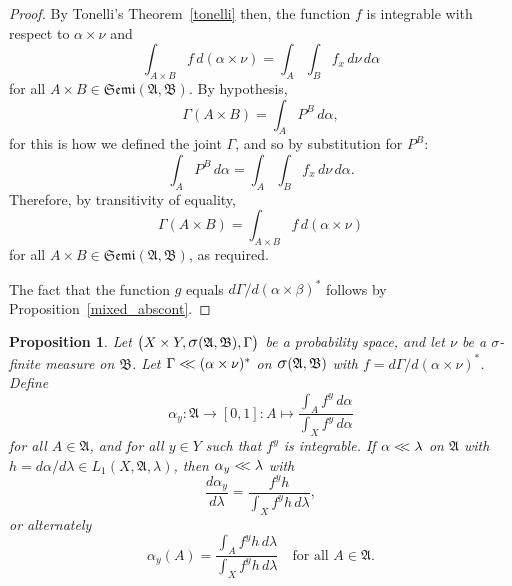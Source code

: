 \documentclass[
twoside=true,
paper=letter,
fontsize=9pt,
pagesize=auto,
leqno,
openany,
headsepline,
overfullrule,
]{scrbook}
\theoremstyle{plain}
\theoremstyle{plain}
\newtheorem{prop}[thm]{Proposition}
\theoremstyle{definition}
\theoremstyle{bfnoteitalic}
\theoremstyle{bfnoteroman}
\newcommand{\sigalg}[1]{\mathfrak{#1}}
\newcommand{\sagb}{\mathop{\hbox{\large{$\sigma$}}}\nolimits}
\newcommand{\textsigma}{\hbox{\large{$\sigma$}}\kern-1pt}
\newcommand{\sigmaalgebra}{\sigalg{A}}
\newcommand{\productsemiring}[2]{\mathfrak{Semi}(#1,#2)}
\newcommand{\productsig}[2]{\sagb(#1,#2)}
\newcommand{\funcf}{f}
\newcommand{\funcg}{g}
\newcommand{\funch}{h}
\newcommand{\function}{f}
\newcommand{\measurespace}{X}
\newcommand{\measurespaceii}{Y}
\newcommand{\abscont}{\mathrel{< \kern-3.5pt <}}
\newcommand{\measnu}{\nu}
\newcommand{\measlambda}{\lambda}
\newcommand{\seti}{A}
\newcommand{\pspace}{\measurespace}%
\newcommand{\sspace}{\measurespaceii}%
\newcommand{\pspaceset}{A}
\newcommand{\sspaceset}{B}
\newcommand{\pspaceelt}{x}
\newcommand{\sspaceelt}{y}
\newcommand{\sspacesig}{\sigalg{B}}
\newcommand{\pspacesig}{\sigalg{A}}
\newcommand{\measonprod}{\Gamma}%
\newcommand{\marginalone}{\alpha}%
\newcommand{\marginaltwo}{\beta}%
\newcommand{\prior}{\marginalone}
\newcommand{\predictive}{\marginaltwo}
\begin{document}
\begin{proof}
By Tonelli's Theorem~\ref{tonelli} then, the function
$\funcf$ is integrable with respect to
$\prior\times\measnu$ and
\[
\int_{\pspaceset\times\sspaceset}
\funcf \,d(\prior\times\measnu)
=
\int_\pspaceset\int_\sspaceset
\function_\pspaceelt\,
d\measnu\,d\prior
\]
for all $\pspaceset\times\sspaceset
\in\productsemiring{\pspacesig}{\sspacesig}.$
By hypothesis,
\[
\measonprod(\pspaceset\times\sspaceset)
=
\int_\pspaceset P^\sspaceset\, d\prior,
\]
for this is how we defined the joint $\measonprod$,
and so by substitution for $P^\sspaceset$:
\[
\int_\pspaceset P^\sspaceset\, d\prior
=
\int_\pspaceset
\int_\sspaceset
\function_\pspaceelt\,
d\measnu\, d\prior.
\]
Therefore, by transitivity of equality,
\[
\measonprod(\pspaceset\times\sspaceset)
=
\int_{\pspaceset\times\sspaceset}
\function \, d(\prior\times\measnu)
\]
for all $\pspaceset\times\sspaceset
\in\productsemiring{\pspacesig}{\sspacesig}$,
as required.

The fact that the function
$\funcg$
equals
$d\measonprod/d(\prior\times\predictive)^*$
follows by Proposition~\ref{mixed_abscont}.
\end{proof}





\begin{prop}
Let
$\bigl(\pspace\times\sspace,
\productsig{\pspacesig}{\sspacesig},
\measonprod\bigr)$
be a probability space, and let
$\measnu$ be a \textsigma-finite measure on $\sspacesig$.
Let  $\measonprod\abscont (\prior\times\measnu)^*$ on
$\productsig{\pspacesig}{\sspacesig}$
with
$\funcf
= d\measonprod/d(\prior\times\measnu)^*$.
Define
\[
\prior_\sspaceelt
:\sigmaalgebra \to [0,1]
:\seti \mapsto
\frac{\int_\pspaceset \function^\sspaceelt \, d\prior}
{\int_\pspace \function^\sspaceelt \, d\prior}
\]
for all $\pspaceset \in \pspacesig$,
and for all $\sspaceelt\in\sspace$ such that
$\function^\sspaceelt$ is integrable.
If $\prior\abscont\measlambda$ on $\pspacesig$ with
$\funch
= d\prior/d\measlambda
\in L_1(\pspace, \pspacesig, \measlambda)$,
then
$\prior_\sspaceelt\abscont\measlambda$ with
\[
\frac
{d \prior_{\sspaceelt}}
{d\measlambda}
=
\frac
{\funcf^{\sspaceelt}\funch}
{\int_{\pspace} \funcf^{\sspaceelt} \funch \, d\measlambda },
\]
or alternately
\[
\prior_{\sspaceelt}(\pspaceset)
=
\frac
{\int_\pspaceset \funcf^{\sspaceelt}\funch \,d\measlambda}
{\int_{\pspace} \funcf^{\sspaceelt} \funch \,d\measlambda}
\quad
\text{for all $\pspaceset\in\pspacesig$.}
\]
\end{prop}
\end{document}
